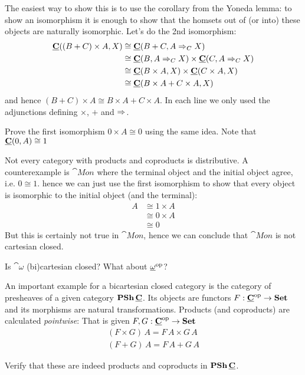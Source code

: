 The easiest way to show this is to use the corollary from the Yoneda lemma: to show an isomorphism it is enough to show that the homsets out of (or into) these objects are naturally isomorphic. Let's do the 2nd isomorphism: 
\begin{align*}
  \homC{C}{(B + C)\times A}{X} 
   & \cong \homC{C}{B+C}{\expC{C}{A}{X}} \\
  & \cong \homC{C}{B}{\expC{C}{A}{X}} \times \homC{C}{C}{\expC{C}{A}{X}} \\
   & \cong \homC{C}{B\times A}{X} \times \homC{C}{C\times A}{X} \\
   & \cong \homC{C}{B \times A + C \times A}{X}
\end{align*}
and hence $(B + C)\times A \cong B\times A + C \times A$.
In each line we only used the adjunctions defining $\times$, $+$ and $\expC{}{}{}$.
\begin{Exercise}
  Prove the first isomorphism $0 \times A \cong 0$ using the same idea. Note that $\homC{C}{0}{A} \cong 1$
\end{Exercise}

Not every category with products and coproducts is distributive. A counterexample is $\cat{Mon}$ where the terminal object and the initial object agree, i.e. $0 \cong 1$. hence we can just use the first isomorphism to show that every object is isomorphic to the initial object (and the terminal):
\begin{align*}
A & \cong 1 \times A \\
& \cong 0 \times A \\
& \cong 0  
\end{align*}
But this is certainly not true in $\cat{Mon}$, hence we can conclude that $\cat{Mon}$ is not cartesian closed. 

\begin{Exercise}
  Is $\cat{\omega}$ (bi)cartesian closed? What about $\cat{\omega}^\op$?
\end{Exercise}

An important example for a bicartesian closed category is the category of presheaves of a given category $\PSh\,\cat{C}$. Its objects are functors $F : \cat{C}^\op \to \Set$ and its morphisms are natural transformations. Products (and coproducts) are calculated \emph{pointwise}: That is given $F,G : \cat{C}^\op \to \Set$
\begin{align*}
  (F \times G)\,A = F\,A \times G\,A \\
  (F + G)\, A = F\,A + G\,A
\end{align*}
\begin{Exercise}
  Verify that these are indeed products and coproducts in $\PSh\,\cat{C}$.
\end{Exercise}

